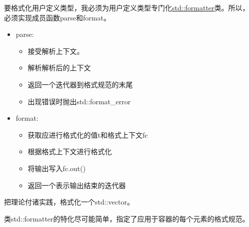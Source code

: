 
要格式化用户定义类型，我必须为用户定义类型专门化\href{https://en.cppreference.com/w/cpp/utility/format/formatter}{std::formatter}类。所以，必须实现成员函数parse和format。

\begin{itemize}
\item 
parse:

\begin{itemize}
\item 
接受解析上下文。

\item 
解析解析后的上下文

\item 
返回一个迭代器到格式规范的末尾

\item 
出现错误时抛出std::format\_error
\end{itemize}

\item 
format:

\begin{itemize}
\item 
获取应进行格式化的值t和格式上下文fc

\item 
根据格式上下文进行格式化

\item 
将输出写入fc.out()

\item 
返回一个表示输出结束的迭代器
\end{itemize}

\end{itemize}

把理论付诸实践，格式化一个std::vector。


类std::formatter的特化尽可能简单，指定了应用于容器的每个元素的格式规范。

